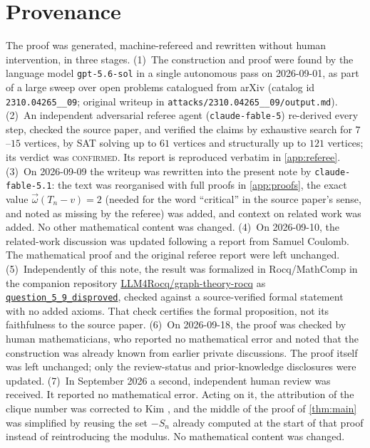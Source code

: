 \documentclass[11pt,a4paper]{article}
\theoremstyle{plain}
\theoremstyle{definition}
\theoremstyle{remark}
\newcommand{\cl}{\overrightarrow{\omega}}
\begin{document}
\section{Provenance}\label{sec:provenance}

The proof was generated, machine-refereed and rewritten without human intervention, in three stages.
(1)~The construction and proof were found by the language model \texttt{gpt-5.6-sol} in a single autonomous pass on 2026-09-01, as part of a large sweep over open problems catalogued from arXiv (catalog id \texttt{2310.04265\_\_09}; original writeup in \texttt{attacks/2310.04265\_\_09/output.md}).
(2)~An independent adversarial referee agent (\texttt{claude-fable-5}) re-derived every step, checked the source paper, and verified the claims by exhaustive search for $7$--$15$ vertices, by SAT solving up to $61$ vertices and structurally up to $121$ vertices; its verdict was \textsc{confirmed}. Its report is reproduced verbatim in \cref{app:referee}.
(3)~On 2026-09-09 the writeup was rewritten into the present note by \texttt{claude-fable-5.1}: the text was reorganised with full proofs in \cref{app:proofs}, the exact value $\cl(T_n-v)=2$ (needed for the word ``critical'' in the source paper's sense, and noted as missing by the referee) was added, and context on related work was added. No other mathematical content was changed.
(4)~On 2026-09-10, the related-work discussion was updated following a report from Samuel Coulomb. The mathematical proof and the original referee report were left unchanged.
(5)~Independently of this note, the result was formalized in Rocq/MathComp in the companion repository \href{https://github.com/LLM4Rocq/graph-theory-rocq}{LLM4Rocq/graph-theory-rocq} as \href{https://github.com/LLM4Rocq/graph-theory-rocq/blob/main/digraph-theory/theories/applications/question_5_9_resolution.v}{\texttt{question\_5\_9\_disproved}}, checked against a source-verified formal statement with no added axioms. That check certifies the formal proposition, not its faithfulness to the source paper.
(6)~On 2026-09-18, the proof was checked by human mathematicians, who reported no mathematical error and noted that the construction was already known from earlier private discussions. The proof itself was left unchanged; only the review-status and prior-knowledge disclosures were updated.
(7)~In September 2026 a second, independent human review was received. It reported no mathematical error. Acting on it, the attribution of the clique number was corrected to Kim \cite{Kim13}, and the middle of the proof of \cref{thm:main} was simplified by reusing the set $-S_n$ already computed at the start of that proof instead of reintroducing the modulus. No mathematical content was changed.
\end{document}
